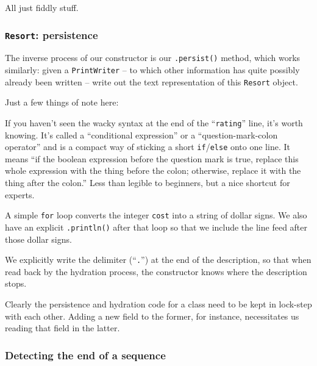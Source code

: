 All just fiddly stuff.

\subsubsection{\texttt{Resort}: persistence}

The inverse process of our constructor is our \texttt{.persist()} method,
which works similarly: given a \texttt{PrintWriter} -- to which other
information has quite possibly already been written -- write out the text
representation of this \texttt{Resort} object.

Just a few things of note here:

\begin{compactitem}

\item If you haven't seen the wacky syntax at the end of the
``\texttt{rating}'' line, it's worth knowing. It's called a ``conditional
expression'' or a ``question-mark-colon operator'' and is a compact way of
sticking a short \texttt{if}/\texttt{else} onto one line. It means ``if the
boolean expression before the question mark is true, replace this whole
expression with the thing before the colon; otherwise, replace it with the
thing after the colon.'' Less than legible to beginners, but a nice shortcut
for experts.

\item A simple \texttt{for} loop converts the integer \texttt{cost} into a
string of dollar signs. We also have an explicit \texttt{.println()} after
that loop so that we include the line feed after those dollar signs.

\item We explicitly write the delimiter (``\texttt{.}'') at the end of the
description, so that when read back by the hydration process, the constructor
knows where the description stops.

\end{compactitem}

Clearly the persistence and hydration code for a class need to be kept in
lock-step with each other. Adding a new field to the former, for instance,
necessitates us reading that field in the latter.

\subsubsection{Detecting the end of a sequence}


